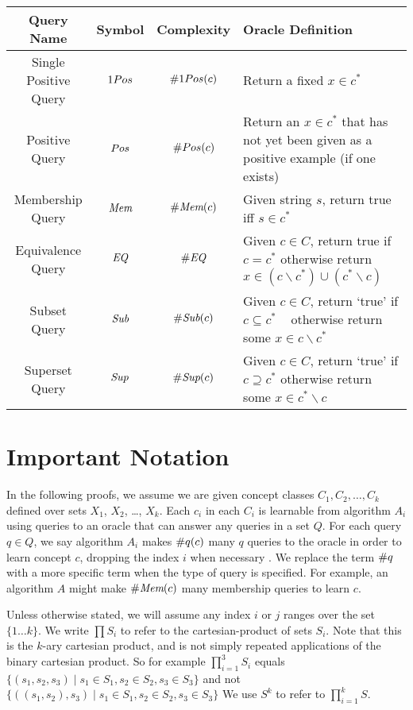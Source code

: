 \begin{table}
\begin{center}
  \begin{tabularx}{\textwidth}{| c | c | c | X | }
    \hline
    Query Name & Symbol & Complexity & Oracle Definition \\ \hline
    Single Positive Query & $\oneposQ$ & $\oneposC(c)$ & Return a fixed $x \in c^*$ \\ \hline
    Positive Query & $Pos$ & $\#Pos(c)$ & Return an $x\in c^*$ that has not yet been given as a positive example (if one exists)\\ \hline
    Membership Query & $\emph{Mem}$ & $\#\emph{Mem}(c)$ & Given string $s$, return true iff $s \in c^*$ \\ \hline
    Equivalence Query & $\emph{EQ}$ & $\#\emph{EQ}$ & Given $c \in C$, return true if $c=c^*$ otherwise return $x \in (c \backslash c^*) \cup (c^* \backslash c)$\\ \hline 
    Subset Query & $\emph{Sub}$ & $\#\emph{Sub}(c)$ & Given $c \in C$, return `true' if $c \subseteq c^*$ \mbox{  } otherwise return some $x \in c \backslash c^*$ \\ \hline
    Superset Query & $\emph{Sup}$ & $\#\emph{Sup}(c)$ & Given $c \in C$, return `true' if $c \supseteq c^*$  otherwise return some $x \in c^* \backslash c$\\ \hline
  \end{tabularx}
\end{center}
\end{table}

\section{Important Notation}

In the following proofs, we assume we are given concept classes $C_1, C_2, \dots, C_k$ defined over sets $X_1$, $X_2$, \dots, $X_k$. 
Each $c_i$ in each $C_i$ is learnable from algorithm $A_i$ using queries to an oracle that can answer any queries in a set $Q$.  
For each query $q \in Q$, we say algorithm $A_i$ makes $\#q(c)$ many $q$ queries to the oracle in order to learn concept $c$, dropping the index $i$ when necessary .
We replace the term $\#q$ with a more specific term when the type of query is specified.
For example, an algorithm $A$ might make $\#\emph{Mem}(c)$ many membership queries to learn $c$. 

Unless otherwise stated, we will assume any index $i$ or $j$ ranges over the set $\{ 1 \dots k \}$.
We write $\prod S_i$ to refer to the cartesian-product of sets $S_i$. 
Note that this is the $k$-ary cartesian product, and is not simply repeated applications of the binary cartesian product.
So for example $\prod_{i=1}^3 S_i$ equals $\{ (s_1, s_2, s_3) \mid s_1 \in S_1, s_2 \in S_2, s_3 \in S_3 \}$ and not $\{ ((s_1, s_2), s_3) \mid s_1 \in S_1, s_2 \in S_2, s_3 \in S_3 \}$
We use $S^k$ to refer to $\prod_{i=1}^k S$. 

